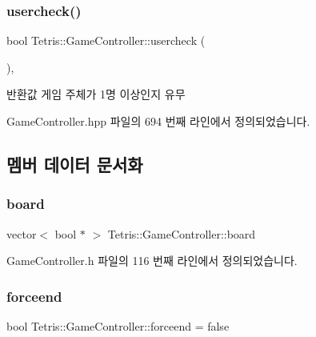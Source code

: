 \subsubsection{\texorpdfstring{usercheck()}{usercheck()}\hspace{0.1cm}{\footnotesize\ttfamily [2/2]}}
{\footnotesize\ttfamily bool Tetris\+::\+Game\+Controller\+::usercheck (\begin{DoxyParamCaption}{ }\end{DoxyParamCaption})\hspace{0.3cm}{\ttfamily [inline]}, {\ttfamily [protected]}}

\begin{DoxyReturn}{반환값}
게임 주체가 1명 이상인지 유무 
\end{DoxyReturn}


Game\+Controller.\+hpp 파일의 694 번째 라인에서 정의되었습니다.



\subsection{멤버 데이터 문서화}
\mbox{\label{class_tetris_1_1_game_controller_a7725b6cec9459a6bffaa3e29dd1c5196}} 
\subsubsection{\texorpdfstring{board}{board}}
{\footnotesize\ttfamily vector$<$ bool $\ast$ $>$ Tetris\+::\+Game\+Controller\+::board\hspace{0.3cm}{\ttfamily [protected]}}



Game\+Controller.\+h 파일의 116 번째 라인에서 정의되었습니다.

\mbox{\label{class_tetris_1_1_game_controller_a015411333b232483387d89f3ba0617e0}} 
\subsubsection{\texorpdfstring{forceend}{forceend}}
{\footnotesize\ttfamily bool Tetris\+::\+Game\+Controller\+::forceend = false}



